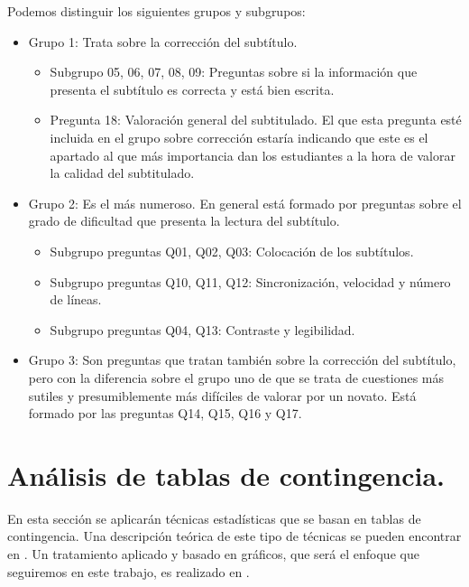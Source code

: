 \documentclass[
  12pt,
  a4paper,
  extrafontsizes,
  onecolumn,
  openright]{memoir}
\providecommand{\tightlist}{%
  \setlength{\itemsep}{0pt}\setlength{\parskip}{0pt}}\usepackage{longtable,booktabs,array}
\begin{document}
Podemos distinguir los siguientes grupos y subgrupos:

\begin{itemize}
\tightlist
\item
  Grupo 1: Trata sobre la corrección del subtítulo.

  \begin{itemize}
  \tightlist
  \item
    Subgrupo 05, 06, 07, 08, 09: Preguntas sobre si la información que
    presenta el subtítulo es correcta y está bien escrita.
  \item
    Pregunta 18: Valoración general del subtitulado. El que esta
    pregunta esté incluida en el grupo sobre corrección estaría
    indicando que este es el apartado al que más importancia dan los
    estudiantes a la hora de valorar la calidad del subtitulado.
  \end{itemize}
\item
  Grupo 2: Es el más numeroso. En general está formado por preguntas
  sobre el grado de dificultad que presenta la lectura del subtítulo.

  \begin{itemize}
  \tightlist
  \item
    Subgrupo preguntas Q01, Q02, Q03: Colocación de los subtítulos.
  \item
    Subgrupo preguntas Q10, Q11, Q12: Sincronización, velocidad y número
    de líneas.
  \item
    Subgrupo preguntas Q04, Q13: Contraste y legibilidad.
  \end{itemize}
\item
  Grupo 3: Son preguntas que tratan también sobre la corrección del
  subtítulo, pero con la diferencia sobre el grupo uno de que se trata
  de cuestiones más sutiles y presumiblemente más difíciles de valorar
  por un novato. Está formado por las preguntas Q14, Q15, Q16 y Q17.
\end{itemize}

\hypertarget{anuxe1lisis-de-tablas-de-contingencia.}{%
\section{Análisis de tablas de
contingencia.}\label{anuxe1lisis-de-tablas-de-contingencia.}}

En esta sección se aplicarán técnicas estadísticas que se basan en
tablas de contingencia. Una descripción teórica de este tipo de técnicas
se pueden encontrar en \textcite{agresti_2018}. Un tratamiento aplicado
y basado en gráficos, que será el enfoque que seguiremos en este
trabajo, es realizado en \textcite{frienly2015}.
\end{document}
